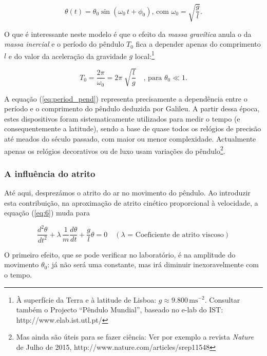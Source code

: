 \documentclass[a4paper,twoside,12pt]{article}      %
\begin{document}
\begin{equation}
	\label{eq:solu_pend}
\theta (t) = \theta_0 \sin(\omega_0 \, t + \phi_0) \text{, com } \omega_0 = \sqrt{\frac{g}{l}}.
\end{equation}

O que é interessante neste modelo é que o efeito da \emph{massa gravítica } anula o da \emph{massa inercial } e o período do pêndulo $T_0$ fica a  depender apenas do comprimento $l$  e do valor da aceleração da gravidade $g$  local:\footnote{À superfície da Terra e à latitude de Lisboa: $g\approx 9.800\,\mathrm{m s^{-2}}$. Consultar também o Projecto ``Pêndulo Mundial'', baseado no e-lab do IST: http://www.elab.ist.utl.pt/}

\begin{equation}
	\label{eq:period_pend}
T_0 = \frac{2 \pi}{\omega_0} = 2\pi\; \sqrt{\frac{l}{g}} \quad  \text{, para }	\theta_0 \ll 1.
\end{equation}

A equação (\ref{eq:period_pend}) representa precisamente a dependência entre o período e o comprimento do pêndulo deduzida por Galileu.
A partir dessa época, estes dispositivos foram sistematicamente utilizados para medir o tempo (e consequentemente a latitude), sendo a base 
de quase todos os relógios de precisão até meados do século passado, com maior ou menor complexidade.
Actualmente apenas os relógios decorativos ou de luxo usam variações do pêndulo\footnote{Mas ainda são úteis para se fazer ciência: Ver por exemplo a revista \emph{Nature} de Julho de 2015, http://www.nature.com/articles/srep11548}.

\subsubsection{A influência do atrito}
Até aqui, desprezámos o atrito do ar no movimento do pêndulo. Ao introduzir esta contribuição, na aproximação de atrito cinético 
proporcional à velocidade, a  equação (\ref{eq:6}) muda para

\begin{equation}
	 \frac{d^2 \theta}{dt^2} + \lambda \, \frac{1}{m}  \frac{d \theta}{dt} + \frac{g}{l} \theta =0 \quad (\lambda \text{ = Coeficiente de atrito viscoso})
\end{equation}

O primeiro efeito, que se pode verificar no laboratório, é na amplitude do movimento $\theta_0$: já não será uma constante, mas irá diminuir inexoravelmente com o tempo. 
\end{document}
